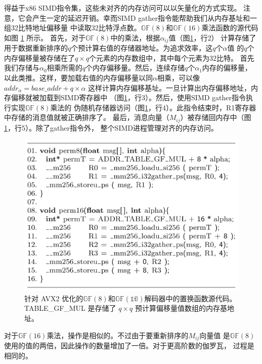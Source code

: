 \documentclass{cjc}
\begin{document}
  得益于x86 SIMD指令集，这些未对齐的内存访问可以以矢量化的方式实现。
  注意，它会产生一定的延迟开销。幸而SIMD gather指令能帮助我们从内存基址和一组32比特地址偏移量
  中读取32比特浮点数。$\mathbb{GF}(8)$和$\mathbb{GF}(16)$乘法函数的源代码如图 \ref{fig:2} 所示。
  首先，对于$\mathbb{GF}(8)$中的乘法，根据$\alpha_{ij}$值（图\ref{fig:2}，行2）
  计算存储了用于数据重新排序的$q$个预计算右值的存储器地址。为追求效率，这$q$个$\alpha$值
  的$q$个内存偏移量被存储在了$q\times{q}$个元素的内存数组中，其中每个元素为32比特。
  首先我们存储与$\alpha_0$相乘所需的$q$个内存偏移量。然后，连续存储$q$个$\alpha_1$内存的偏移量，
  以此类推。这样，要加载右值的内存偏移量以同$\alpha$相乘，可以像$addr_{\alpha}=base\_addr+q\times\alpha$
  这样计算内存偏移基址。一旦计算出内存偏移地址，内存偏移就被加载到SIMD寄存器中
  （图\ref{fig:2}，行3）。然后，使用SIMD gather指令执行实现$\mathbb{GF}(8)$乘法的
  伪随机存储器访问（图\ref{fig:2}，行4）。此指令结束时，R1寄存器中存储的消息值就被正确排序了。
  最后，消息向量（$M_{ij}$）被存储回内存中（图\ref{fig:2}，行5）。除了gather指令外，
  整个SIMD进程管理对齐的内存访问。
  
\begin{figure}
  \includegraphics[width=\linewidth]{assets/fig2.png}
  \caption{
    针对 AVX2 优化的$\mathbb{GF}(8)$和$\mathbb{GF(16)}$解码器中的置换函数源代码。
    TABLE\_GF\_MUL 是存储了 $q\times{q}$ 预计算偏移量值数组的内存基地址。
  }\label{fig:2}
\end{figure}

  对于$\mathbb{GF}(16)$乘法，操作是相似的。不过由于要重新排序的$M_{ij}$向量值
  是$\mathbb{GF}(8)$使用的值的两倍，因此操作的数量增加了一倍。对于更高阶数的伽罗瓦，
  过程是相同的。
\end{document}

